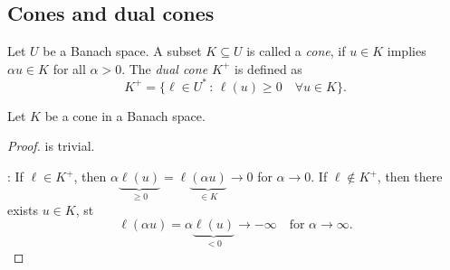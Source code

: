 \documentclass[../skript.tex]{subfiles}
\begin{document}
\subsection{Cones and dual cones}
\begin{definition} %
\label{def:c1e35}
Let $U$ be a Banach space. A subset $K \subseteq U$ is called a \emph{cone}, if $u \in K$ implies $\alpha u \in K$ for all $\alpha > 0$. The \emph{dual cone $K^+$} is defined as
\[
	K^+ = \{ \ell \in U^* \, : \, \ell(u) \geq 0 \quad \forall u \in K \}.
\]
\end{definition}
\begin{proposition} %
\label{prop:c1e36}
Let $K$ be a cone in a Banach space.
\end{proposition}
\begin{proof}
 is trivial.

: If $\ell \in K^+$, then $\alpha \underbrace{ \ell(u) }_{\geq 0} = \ell\underbrace{(\alpha u)}_{\in K} \to 0$ for $\alpha \to 0$. If $\ell \notin K^+$, then there exists $u \in K$, \ac{st}
\[
	\ell(\alpha u) = \alpha \underbrace{\ell(u)}_{< 0} \to -\infty \quad \text{for } \alpha \to \infty.
\]
\end{proof}
\end{document}
